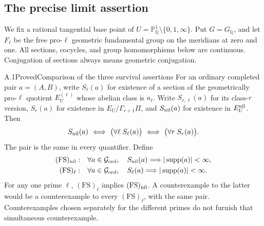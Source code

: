 \subsection{The precise limit assertion}

We fix a rational tangential base point of
\(U=\mathbb P^1_{\mathbb Q}\setminus\{0,1,\infty\}\).
Put \(G=G_{\mathbb Q}\), and let \(F_\ell\) be the free pro-\(\ell\)
geometric fundamental group on the meridians at zero and one.
All sections, cocycles, and group homomorphisms below are continuous.
Conjugation of sections always means geometric conjugation.

\begin{result}{A.1}{Proved}{Comparison of the three survival assertions}
For an ordinary completed pair \(a=(A,B)\), write \(S_\ell(a)\)
for existence of a section of the geometrically pro-\(\ell\) quotient
\(E_U^{(\ell)}\) whose abelian class is \(a_\ell\).
Write \(S_{r,\ell}(a)\) for its class-\(r\) version,
\(S_r(a)\) for existence in \(E_U/\Gamma_{r+1}\Pi\), and
\(S_{\rm nil}(a)\) for existence in \(E_U^{\rm nil}\).
Then
\[
 S_{\rm nil}(a)\ \Longleftrightarrow\
 \bigl(\forall\ell\;S_\ell(a)\bigr)
 \ \Longleftrightarrow\
 \bigl(\forall r\;S_r(a)\bigr).
\]
The pair is the same in every quantifier. Define
\[
\begin{split}
 (\mathrm{FS})_{\rm nil}:\quad&
 \forall a\in\mathcal G_{\rm ord},\quad
 S_{\rm nil}(a)\Longrightarrow |\operatorname{supp}(a)|<\infty,\\
 (\mathrm{FS})_\ell:\quad&
 \forall a\in\mathcal G_{\rm ord},\quad
 S_\ell(a)\Longrightarrow |\operatorname{supp}(a)|<\infty.
\end{split}
\]
For any one prime \(\ell\), \((\mathrm{FS})_\ell\) implies
\((\mathrm{FS})_{\rm nil}\). A counterexample to the latter would
be a counterexample to every \((\mathrm{FS})_\ell\), with the same pair.
Counterexamples chosen separately for the different primes do not furnish
that simultaneous counterexample.
\end{result}
